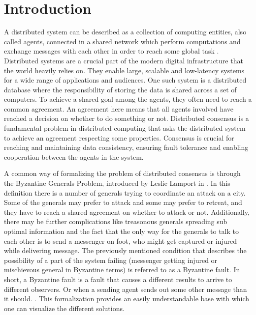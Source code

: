 \section{Introduction}
\thispagestyle{empty}
A distributed system can be described as a collection of computing entities, also called agents, connected in a shared network which perform computations and exchange messages with each other in order to reach some global task \cite{Coulouris_systems_2005}. Distributed systems are a crucial part of the modern digital infrastructure that the world heavily relies on. They enable large, scalable and low-latency systems for a wide range of applications and audiences. One such system is a distributed database where the responsibility of storing the data is shared across a set of computers. To achieve a shared goal among the agents, they often need to reach a common agreement. An agreement here means that all agents involved have reached a decision on whether to do something or not. Distributed consensus is a fundamental problem in distributed computing that asks the distributed system to achieve an agreement respecting some properties. Consensus is crucial for reaching and maintaining data consistency, ensuring fault tolerance and enabling cooperation between the agents in the system. \cite{Lynch_distributed_2017}

A common way of formalizing the problem of distributed consensus is through the Byzantine Generals Problem, introduced by Leslie Lamport in \cite{lamportByzantineGeneralsProblem}. In this definition there is a number of generals trying to coordinate an attack on a city. Some of the generals may prefer to attack and some may prefer to retreat, and they have to reach a shared agreement on whether to attack or not. Additionally, there may be further complications like treasonous generals spreading sub optimal information and the fact that the only way for the generals to talk to each other is to send a messenger on foot, who might get captured or injured while delivering message. 
The previously mentioned condition that describes the possibility of a part of the system failing (messenger getting injured or mischievous general in Byzantine terms) is referred to as a Byzantine fault. In short, a Byzantine fault is a fault that causes a different results to arrive to different observers. Or when a sending agent sends out some other message than it should. \cite{driscollRealByzantineGenerals2004}. 
This formalization provides an easily understandable base with which one can visualize the different solutions.

